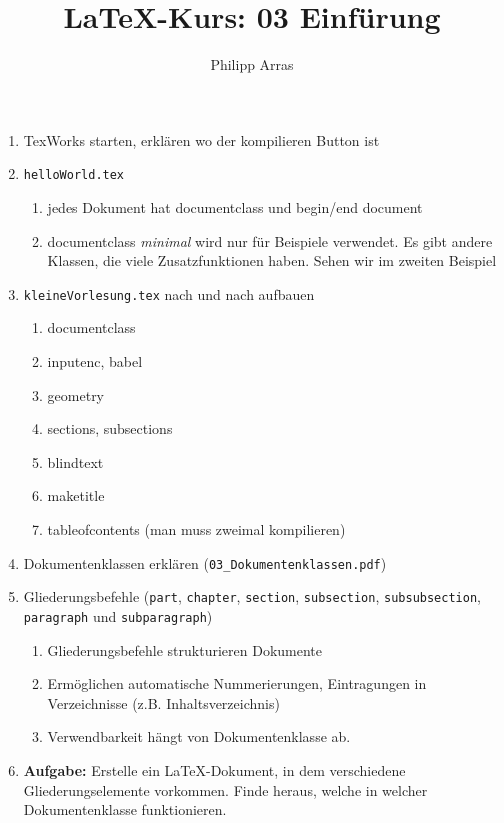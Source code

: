 \documentclass[11pt,a4paper]{article}
\author{Philipp Arras}
\title{\LaTeX -Kurs: 03 Einfürung}
\begin{document}
\maketitle

\begin{enumerate}
\item TexWorks starten, erklären wo der kompilieren Button ist
\item \verb|helloWorld.tex|
	\begin{enumerate}
	\item jedes Dokument hat documentclass und begin/end document
	\item documentclass \emph{minimal} wird nur für Beispiele verwendet. Es gibt andere Klassen, die viele Zusatzfunktionen haben. Sehen wir im zweiten Beispiel
	\end{enumerate}
\item \verb|kleineVorlesung.tex| nach und nach aufbauen
	\begin{enumerate}
	\item documentclass
	\item inputenc, babel
	\item geometry
	\item sections, subsections
	\item blindtext
	\item maketitle
	\item tableofcontents (man muss zweimal kompilieren)	
	\end{enumerate}
\item Dokumentenklassen erklären (\verb|03_Dokumentenklassen.pdf|)
\item Gliederungsbefehle (\verb|part|, \verb|chapter|, \verb|section|, \verb|subsection|, \verb|subsubsection|, \verb|paragraph| und \verb|subparagraph|)
	\begin{enumerate}
		\item Gliederungsbefehle strukturieren Dokumente
		\item Ermöglichen automatische Nummerierungen, Eintragungen in Verzeichnisse (z.B. Inhaltsverzeichnis)
		\item  Verwendbarkeit hängt von Dokumentenklasse ab.
	\end{enumerate}	
\item \textbf{Aufgabe: } Erstelle ein \LaTeX -Dokument, in dem verschiedene Gliederungselemente vorkommen. Finde heraus, welche in welcher Dokumentenklasse funktionieren.
\end{enumerate}
\end{document}
